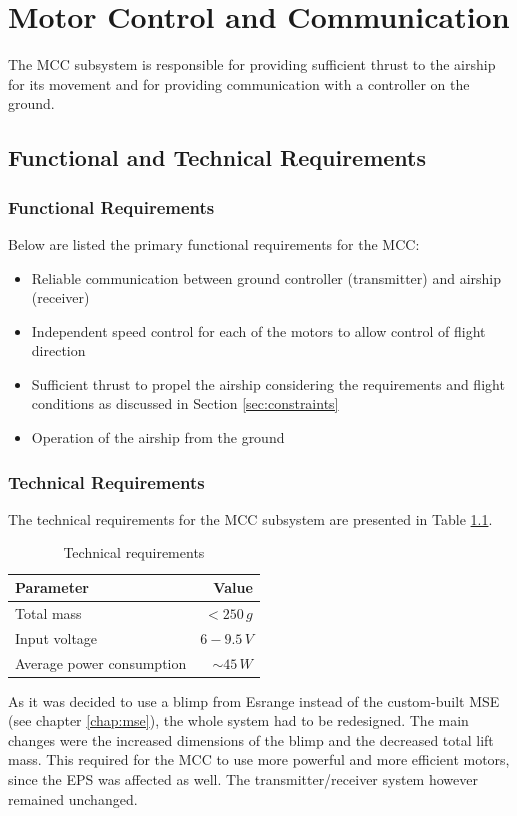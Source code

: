\chapter{Motor Control and Communication}
\label{chap:mcc}

The \ac{MCC} subsystem is responsible for providing sufficient thrust to the airship for its movement and for providing communication with a controller on the ground.
%
\section{Functional and Technical Requirements}
%
\subsection{Functional Requirements}
%
Below are listed the primary functional requirements for the \ac{MCC}:
%
\begin{itemize}
\item Reliable communication between ground controller (transmitter) and airship (receiver)
\item Independent speed control for each of the motors to allow control of flight direction
\item Sufficient thrust to propel the airship considering the requirements and flight conditions as discussed in Section \ref{sec:constraints}
\item Operation of the airship from the ground 
\end{itemize}
%
\subsection{Technical Requirements}
%
The technical requirements for the \ac{MCC} subsystem are presented in Table \ref{tab:technical_requirements_mcc}.
%
\begin{table}[H]
\centering
\caption{Technical requirements}
\label{tab:technical_requirements_mcc}
\begin{tabular}{l r}
\hline
\textbf{Parameter} & \textbf{Value}\\ \hline
Total mass & $<250\,g$\\
Input voltage & $6-9.5\,V$\\
Average power consumption & $\sim 45\,W$\\
\hline
\end{tabular}
\end{table}
%
\noindent
As it was decided to use a blimp from Esrange instead of the custom-built \ac{MSE} (see chapter \ref{chap:mse}), the whole system had to be redesigned. The main changes were the increased dimensions of the blimp and the decreased total lift mass. This required for the \ac{MCC} to use more powerful and more efficient motors, since the \ac{EPS} was affected as well. The transmitter/receiver system however remained unchanged.
%
